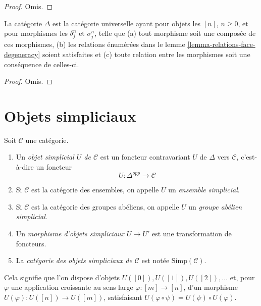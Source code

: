\begin{proof}
Omis.
\end{proof}

\begin{lemma}
\label{lemma-face-degeneracy-category}
La catégorie $\Delta$ est la catégorie universelle ayant pour objets les
$[n]$, $n \geq 0$, et pour morphismes les $\delta^n_j$ et $\sigma^n_j$,
telle que (a) tout morphisme soit une composée de ces morphismes,
(b) les relations énumérées dans le lemme
\ref{lemma-relations-face-degeneracy} soient satisfaites et
(c) toute relation entre les morphismes soit une conséquence de celles-ci.
\end{lemma}

\begin{proof}
Omis.
\end{proof}







\section{Objets simpliciaux}
\label{section-simplicial-object}

\begin{definition}
\label{definition-simplicial-object}
Soit $\mathcal{C}$ une catégorie.
\begin{enumerate}
\item Un {\it objet simplicial $U$ de $\mathcal{C}$}
est un foncteur contravariant $U$ de $\Delta$ vers
$\mathcal{C}$, c'est-à-dire un foncteur
$$
U : \Delta^{opp} \longrightarrow \mathcal{C}
$$
\item Si $\mathcal{C}$ est la catégorie des ensembles, on appelle
$U$ un {\it ensemble simplicial}.
\item Si $\mathcal{C}$ est la catégorie des groupes abéliens,
on appelle $U$ un {\it groupe abélien simplicial}.
\item Un {\it morphisme d'objets simpliciaux $U \to U'$}
est une transformation de foncteurs.
\item La {\it catégorie des objets simpliciaux de $\mathcal{C}$}
est notée $\text{Simp}(\mathcal{C})$.
\end{enumerate}
\end{definition}

\noindent
Cela signifie que l'on dispose d'objets $U([0]), U([1]), U([2]), \ldots$
et, pour $\varphi$ une application croissante au sens large
$\varphi : [m] \to [n]$, d'un morphisme
$U(\varphi) : U([n]) \to U([m])$, satisfaisant
$U(\varphi \circ \psi) = U(\psi) \circ U(\varphi)$.


